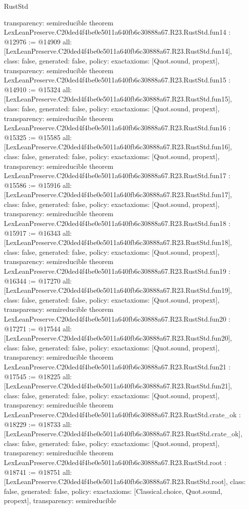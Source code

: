 \begin{lexlean}{RustStd}
\begin{coremodule}
{  transparency: semireducible
}
theorem LexLeanPreserve.C20ded4f4be0e5011a640fb6c30888a67.R23.RustStd.fun14 : @12976 := @14909 {
  all: [LexLeanPreserve.C20ded4f4be0e5011a640fb6c30888a67.R23.RustStd.fun14],
  class: false,
  generated: false,
  policy: exact{axioms: [Quot.sound, propext]},
  transparency: semireducible
}
theorem LexLeanPreserve.C20ded4f4be0e5011a640fb6c30888a67.R23.RustStd.fun15 : @14910 := @15324 {
  all: [LexLeanPreserve.C20ded4f4be0e5011a640fb6c30888a67.R23.RustStd.fun15],
  class: false,
  generated: false,
  policy: exact{axioms: [Quot.sound, propext]},
  transparency: semireducible
}
theorem LexLeanPreserve.C20ded4f4be0e5011a640fb6c30888a67.R23.RustStd.fun16 : @15325 := @15585 {
  all: [LexLeanPreserve.C20ded4f4be0e5011a640fb6c30888a67.R23.RustStd.fun16],
  class: false,
  generated: false,
  policy: exact{axioms: [Quot.sound, propext]},
  transparency: semireducible
}
theorem LexLeanPreserve.C20ded4f4be0e5011a640fb6c30888a67.R23.RustStd.fun17 : @15586 := @15916 {
  all: [LexLeanPreserve.C20ded4f4be0e5011a640fb6c30888a67.R23.RustStd.fun17],
  class: false,
  generated: false,
  policy: exact{axioms: [Quot.sound, propext]},
  transparency: semireducible
}
theorem LexLeanPreserve.C20ded4f4be0e5011a640fb6c30888a67.R23.RustStd.fun18 : @15917 := @16343 {
  all: [LexLeanPreserve.C20ded4f4be0e5011a640fb6c30888a67.R23.RustStd.fun18],
  class: false,
  generated: false,
  policy: exact{axioms: [Quot.sound, propext]},
  transparency: semireducible
}
theorem LexLeanPreserve.C20ded4f4be0e5011a640fb6c30888a67.R23.RustStd.fun19 : @16344 := @17270 {
  all: [LexLeanPreserve.C20ded4f4be0e5011a640fb6c30888a67.R23.RustStd.fun19],
  class: false,
  generated: false,
  policy: exact{axioms: [Quot.sound, propext]},
  transparency: semireducible
}
theorem LexLeanPreserve.C20ded4f4be0e5011a640fb6c30888a67.R23.RustStd.fun20 : @17271 := @17544 {
  all: [LexLeanPreserve.C20ded4f4be0e5011a640fb6c30888a67.R23.RustStd.fun20],
  class: false,
  generated: false,
  policy: exact{axioms: [Quot.sound, propext]},
  transparency: semireducible
}
theorem LexLeanPreserve.C20ded4f4be0e5011a640fb6c30888a67.R23.RustStd.fun21 : @17545 := @18225 {
  all: [LexLeanPreserve.C20ded4f4be0e5011a640fb6c30888a67.R23.RustStd.fun21],
  class: false,
  generated: false,
  policy: exact{axioms: [Quot.sound, propext]},
  transparency: semireducible
}
theorem LexLeanPreserve.C20ded4f4be0e5011a640fb6c30888a67.R23.RustStd.crate_ok : @18229 := @18733 {
  all: [LexLeanPreserve.C20ded4f4be0e5011a640fb6c30888a67.R23.RustStd.crate_ok],
  class: false,
  generated: false,
  policy: exact{axioms: [Quot.sound, propext]},
  transparency: semireducible
}
theorem LexLeanPreserve.C20ded4f4be0e5011a640fb6c30888a67.R23.RustStd.root : @18741 := @18751 {
  all: [LexLeanPreserve.C20ded4f4be0e5011a640fb6c30888a67.R23.RustStd.root],
  class: false,
  generated: false,
  policy: exact{axioms: [Classical.choice, Quot.sound, propext]},
  transparency: semireducible
}


\end{coremodule}
\end{lexlean}
